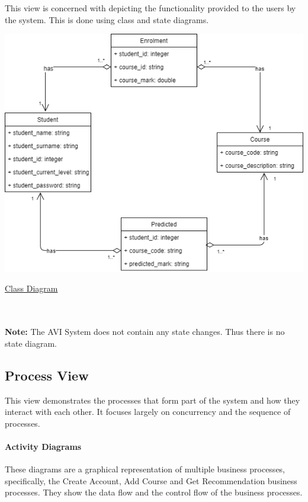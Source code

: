\documentclass[10pt]{article}
\begin{document}
This view is concerned with depicting the functionality provided to the users by the system. This is done using class and state diagrams.
\begin{center}
\includegraphics[width=.9\textwidth]{class_diagram.png}
\end{center}
\caption{\underline{Class Diagram}} \\ \\

\textbf{Note:} The AVI System does not contain any state changes. Thus there is no state diagram. 

\subsection{Process View}

This view demonstrates the processes that form part of the system and how they interact with each other. It focuses largely on concurrency and the sequence of processes.


\paragraph{Activity Diagrams \\}
These diagrams are a graphical representation of multiple business processes, specifically, the Create Account, Add Course and Get Recommendation business processes. They show the data flow and the control flow of the business processes.
\end{document}
